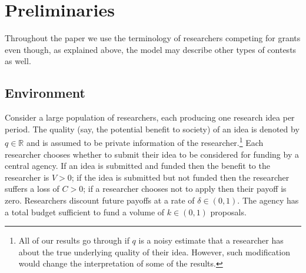 \documentclass[12pt]{article}
\theoremstyle{plain}
\theoremstyle{definition}
\theoremstyle{remark}
\def\RR{\mathbb{R}}
\begin{document}




\section{Preliminaries}\label{sec-preliminaries}

Throughout the paper we use the terminology of researchers competing for grants even though, as explained above, the model may describe other types of contests as well. 

\subsection{Environment}\label{subsec-environment}

Consider a large population of researchers, each producing one research idea per period. The quality (say, the potential benefit to society) of an idea is denoted by $q\in \RR$ and is assumed to be private information of the researcher.\footnote{All of our results go through if $q$ is a noisy estimate that a researcher has about the true underlying quality of their idea. However, such modification would change the interpretation of some of the results.} Each researcher chooses whether to submit their idea to be considered for funding by a central agency.
If an idea is submitted and funded then the benefit to the researcher is $V>0$; if the idea is submitted but not funded then the researcher suffers a loss of $C>0$; if a researcher chooses not to apply then their payoff is zero. Researchers discount future payoffs at a rate of $\delta\in (0,1)$. The agency has a total budget sufficient to fund a volume of $k\in (0,1)$ proposals.%
\end{document}
